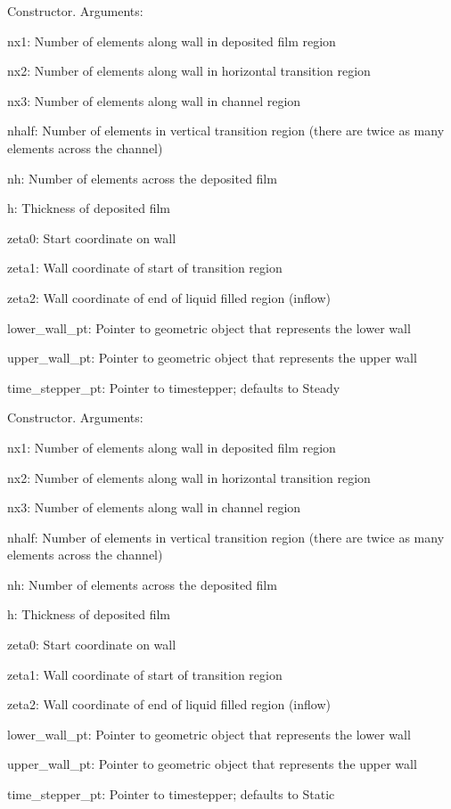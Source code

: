 Constructor. Arguments\+: 


\begin{DoxyItemize}
\item nx1\+: Number of elements along wall in deposited film region
\item nx2\+: Number of elements along wall in horizontal transition region
\item nx3\+: Number of elements along wall in channel region
\item nhalf\+: Number of elements in vertical transition region (there are twice as many elements across the channel)
\item nh\+: Number of elements across the deposited film
\item h\+: Thickness of deposited film
\item zeta0\+: Start coordinate on wall
\item zeta1\+: Wall coordinate of start of transition region
\item zeta2\+: Wall coordinate of end of liquid filled region (inflow)
\item lower\+\_\+wall\+\_\+pt\+: Pointer to geometric object that represents the lower wall
\item upper\+\_\+wall\+\_\+pt\+: Pointer to geometric object that represents the upper wall
\item time\+\_\+stepper\+\_\+pt\+: Pointer to timestepper; defaults to Steady
\end{DoxyItemize}

Constructor. Arguments\+:
\begin{DoxyItemize}
\item nx1\+: Number of elements along wall in deposited film region
\item nx2\+: Number of elements along wall in horizontal transition region
\item nx3\+: Number of elements along wall in channel region
\item nhalf\+: Number of elements in vertical transition region (there are twice as many elements across the channel)
\item nh\+: Number of elements across the deposited film
\item h\+: Thickness of deposited film
\item zeta0\+: Start coordinate on wall
\item zeta1\+: Wall coordinate of start of transition region
\item zeta2\+: Wall coordinate of end of liquid filled region (inflow)
\item lower\+\_\+wall\+\_\+pt\+: Pointer to geometric object that represents the lower wall
\item upper\+\_\+wall\+\_\+pt\+: Pointer to geometric object that represents the upper wall
\item time\+\_\+stepper\+\_\+pt\+: Pointer to timestepper; defaults to Static 
\end{DoxyItemize}


